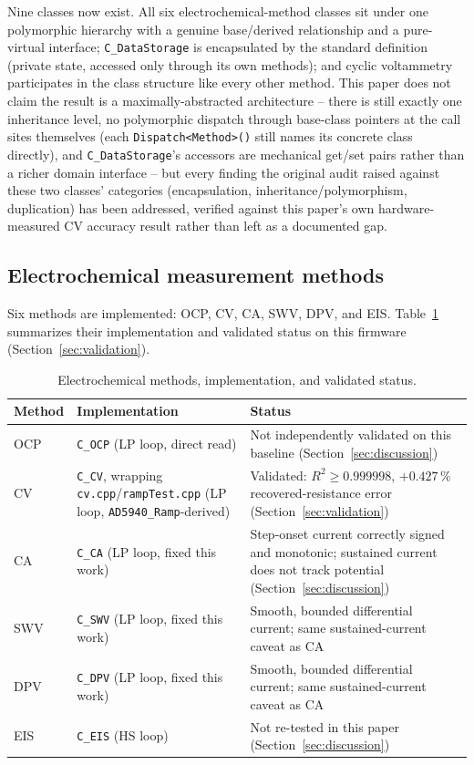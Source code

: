 Nine classes now exist. All six electrochemical-method classes sit under
one polymorphic hierarchy with a genuine base/derived relationship and a
pure-virtual interface; \texttt{C\_DataStorage} is encapsulated by the
standard definition (private state, accessed only through its own
methods); and cyclic voltammetry participates in the class structure like
every other method. This paper does not claim the result is a
maximally-abstracted architecture -- there is still exactly one
inheritance level, no polymorphic dispatch through base-class pointers at
the call sites themselves (each \texttt{Dispatch<Method>()} still names its
concrete class directly), and \texttt{C\_DataStorage}'s accessors are
mechanical get/set pairs rather than a richer domain interface -- but every
finding the original audit raised against these two classes'
categories (encapsulation, inheritance/polymorphism, duplication) has been
addressed, verified against this paper's own hardware-measured CV accuracy
result rather than left as a documented gap.

\subsection{Electrochemical measurement methods}
\label{sec:methodstable}
Six methods are implemented: OCP, CV, CA, SWV, DPV, and EIS.
Table~\ref{tab:methods} summarizes their implementation and validated
status on this firmware (Section~\ref{sec:validation}).

\begin{table}[H]
\centering
\footnotesize
\setlength{\tabcolsep}{4pt}
\caption{Electrochemical methods, implementation, and validated status.}
\label{tab:methods}
\begin{tabular}{@{}p{0.9cm}p{2.6cm}p{3.6cm}@{}}
\toprule
Method & Implementation & Status \\
\midrule
OCP & \texttt{C\_OCP} (LP loop, direct read) & Not independently
  validated on this baseline (Section~\ref{sec:discussion}) \\
CV & \texttt{C\_CV}, wrapping \texttt{cv.cpp}/\allowbreak\texttt{rampTest.cpp} (LP loop, \texttt{AD5940\_Ramp}-derived) & Validated: $R^2\geq0.999998$,
  $+0.427\,\%$ recovered-resistance error (Section~\ref{sec:validation}) \\[7pt]
CA & \texttt{C\_CA} (LP loop, fixed this work) & Step-onset current
  correctly signed and monotonic; sustained current does not track
  potential (Section~\ref{sec:discussion}) \\
SWV & \texttt{C\_SWV} (LP loop, fixed this work) & Smooth, bounded
  differential current; same sustained-current caveat as CA \\
DPV & \texttt{C\_DPV} (LP loop, fixed this work) & Smooth, bounded
  differential current; same sustained-current caveat as CA \\
EIS & \texttt{C\_EIS} (HS loop) & Not re-tested in this paper
  (Section~\ref{sec:discussion}) \\
\bottomrule
\end{tabular}
\end{table}

